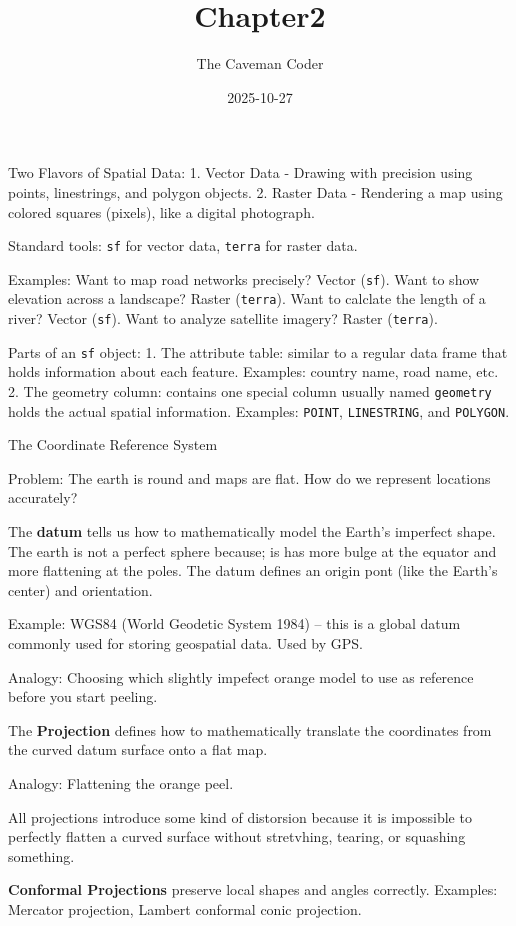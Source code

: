 \documentclass[
]{article}
\title{Chapter2}
\author{The Caveman Coder}
\date{2025-10-27}
\begin{document}
\maketitle

Two Flavors of Spatial Data: 1. Vector Data - Drawing with precision
using points, linestrings, and polygon objects. 2. Raster Data -
Rendering a map using colored squares (pixels), like a digital
photograph.

Standard tools: \texttt{sf} for vector data, \texttt{terra} for raster
data.

Examples: Want to map road networks precisely? Vector (\texttt{sf}).
Want to show elevation across a landscape? Raster (\texttt{terra}). Want
to calclate the length of a river? Vector (\texttt{sf}). Want to analyze
satellite imagery? Raster (\texttt{terra}).

Parts of an \texttt{sf} object: 1. The attribute table: similar to a
regular data frame that holds information about each feature. Examples:
country name, road name, etc. 2. The geometry column: contains one
special column usually named \texttt{geometry} holds the actual spatial
information. Examples: \texttt{POINT}, \texttt{LINESTRING}, and
\texttt{POLYGON}.

The Coordinate Reference System

Problem: The earth is round and maps are flat. How do we represent
locations accurately?

The \textbf{datum} tells us how to mathematically model the Earth's
imperfect shape. The earth is not a perfect sphere because; is has more
bulge at the equator and more flattening at the poles. The datum defines
an origin pont (like the Earth's center) and orientation.

Example: WGS84 (World Geodetic System 1984) -- this is a global datum
commonly used for storing geospatial data. Used by GPS.

Analogy: Choosing which slightly impefect orange model to use as
reference before you start peeling.

The \textbf{Projection} defines how to mathematically translate the
coordinates from the curved datum surface onto a flat map.

Analogy: Flattening the orange peel.

All projections introduce some kind of distorsion because it is
impossible to perfectly flatten a curved surface without stretvhing,
tearing, or squashing something.

\textbf{Conformal Projections} preserve local shapes and angles
correctly. Examples: Mercator projection, Lambert conformal conic
projection.
\end{document}
